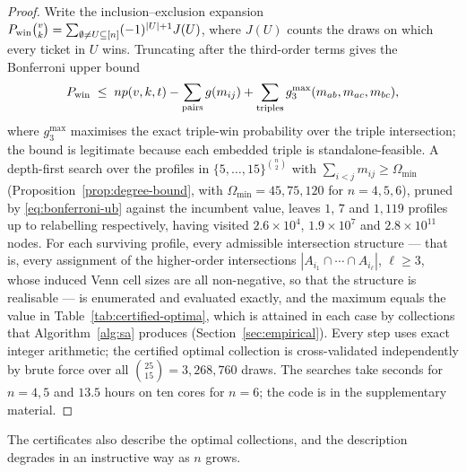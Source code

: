 \begin{proof}
  Write the inclusion--exclusion expansion
  $P_{\mathrm{win}} \binom{v}{k}
   = \sum_{\emptyset \ne U \subseteq [n]} (-1)^{|U|+1} J(U)$,
  where $J(U)$ counts the draws on which every ticket in $U$ wins.
  Truncating after the third-order terms gives the Bonferroni upper bound
  \begin{equation}
    \label{eq:bonferroni-ub}
    P_{\mathrm{win}} \;\le\; np(v,k,t) - \sum_{\text{pairs}} g(m_{ij})
      + \sum_{\text{triples}}
        g_3^{\max}(m_{ab}, m_{ac}, m_{bc}),
  \end{equation}
  where $g_3^{\max}$ maximises the exact triple-win probability over the
  triple intersection; the bound is legitimate because each embedded
  triple is standalone-feasible.  A depth-first search over the profiles
  in $\{5,\ldots,15\}^{\binom{n}{2}}$ with
  $\sum_{i<j} m_{ij} \ge \Omega_{\min}$
  (Proposition~\ref{prop:degree-bound}, with $\Omega_{\min} = 45, 75, 120$
  for $n = 4,5,6$), pruned by \eqref{eq:bonferroni-ub} against the
  incumbent value, leaves $1$, $7$ and $1{,}119$ profiles up to
  relabelling respectively, having visited $2.6 \times 10^4$,
  $1.9 \times 10^7$ and $2.8 \times 10^{11}$ nodes.  For each surviving
  profile, every admissible intersection structure --- that is, every
  assignment of the higher-order intersections $|A_{i_1} \cap \cdots \cap
  A_{i_\ell}|$, $\ell \ge 3$, whose induced Venn cell sizes are all
  non-negative, so that the structure is realisable --- is enumerated and
  evaluated exactly, and the maximum equals the value in
  Table~\ref{tab:certified-optima}, which is attained in each case by
  collections that Algorithm~\ref{alg:sa} produces
  (Section~\ref{sec:empirical}).  Every step uses exact
  integer arithmetic; the certified optimal collection is cross-validated
  independently by brute force over all $\binom{25}{15} = 3{,}268{,}760$
  draws.  The searches take seconds for $n = 4, 5$ and $13.5$ hours on
  ten cores for $n = 6$; the code is in the supplementary material.
\end{proof}

The certificates also describe the optimal collections, and the
description degrades in an instructive way as $n$ grows.

